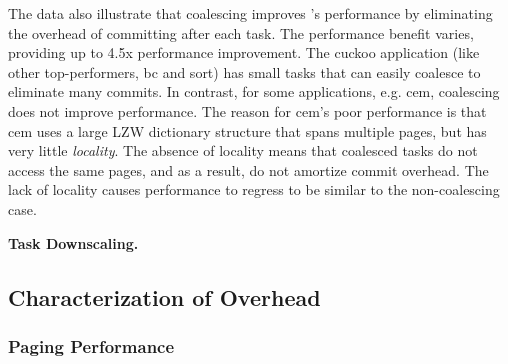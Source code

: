 The data also illustrate that coalescing improves \sys's performance by eliminating the overhead of committing after each task. The performance benefit varies, providing up to 4.5x performance improvement. The cuckoo application (like other top-performers, bc and sort) has small tasks that \sys can easily coalesce to eliminate many commits. In contrast, for some applications, e.g. cem, coalescing does not improve performance. The reason for cem's poor performance is that cem uses a large LZW dictionary structure that spans multiple pages, but has very little {\em locality}. The absence of locality means that coalesced tasks do not access the same pages, and as a result, do not amortize commit overhead. The lack of locality causes performance to regress to be similar to the non-coalescing case. 

\textbf{Task Downscaling.} 

\subsection{Characterization of \sys Overhead}
\label{sec:coala_overhead}


\subsubsection{\sys Paging Performance}
\label{sec:results_memory_management}

